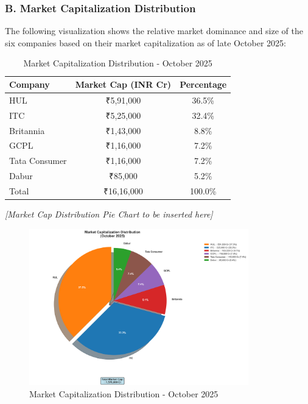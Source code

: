 \documentclass[12pt, a4paper]{report}
\begin{document}
\subsubsection*{B. Market Capitalization Distribution}

The following visualization shows the relative market dominance and size of the six companies based on their market capitalization as of late October 2025:

\begin{table}[H]
\centering
\begin{tabular}{lcc}
\toprule
\textbf{Company} & \textbf{Market Cap (INR Cr)} & \textbf{Percentage} \\
\midrule
HUL & ₹5,91,000 & 36.5\% \\
ITC & ₹5,25,000 & 32.4\% \\
Britannia & ₹1,43,000 & 8.8\% \\
GCPL & ₹1,16,000 & 7.2\% \\
Tata Consumer & ₹1,16,000 & 7.2\% \\
Dabur & ₹85,000 & 5.2\% \\
\midrule
Total & ₹16,16,000 & 100.0\% \\
\bottomrule
\end{tabular}
\caption{Market Capitalization Distribution - October 2025}
\end{table}

\textit{[Market Cap Distribution Pie Chart to be inserted here]}

\vspace{0.5cm}

\begin{figure}[H]
    \centering
    \includegraphics[width=0.85\textwidth]{assets/industry_profile /market_cap_chart.png}
    \caption{Market Capitalization Distribution - October 2025}
\end{figure}
\end{document}
